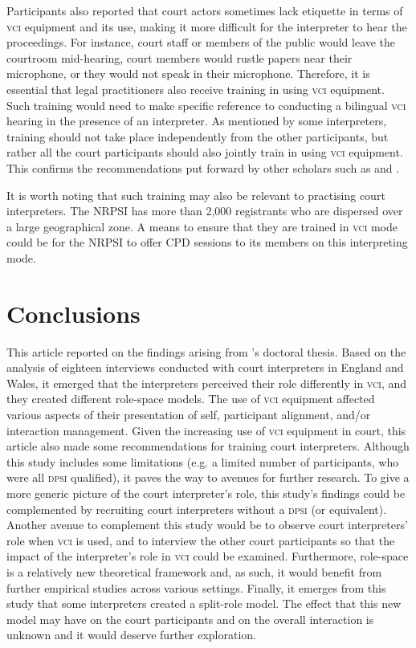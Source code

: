 \documentclass[output=paper]{langsci/langscibook}
\begin{document}
Participants also reported that court actors sometimes lack etiquette in terms of \textsc{vci} equipment and its use, making it more difficult for the interpreter to hear the proceedings. For instance, court staff or members of the public would leave the courtroom mid-hearing, court members would rustle papers near their microphone, or they would not speak in their microphone. Therefore, it is essential that legal practitioners also receive training in using \textsc{vci} equipment. Such training would need to make specific reference to conducting a bilingual \textsc{vci} hearing in the presence of an interpreter. As mentioned by some interpreters, training should not take place independently from the other participants, but rather all the court participants should also jointly train in using \textsc{vci} equipment. This confirms the recommendations put forward by other scholars such as \citet{Braun2011a} and \citet{Fowler2012}. 

It is worth noting that such training may also be relevant to practising court interpreters. The \textsc{NRPSI} has more than 2,000 registrants who are dispersed over a large geographical zone. A means to ensure that they are trained in \textsc{vci} mode could be for the \textsc{NRPSI} to offer \textsc{CPD} sessions to its members on this interpreting mode. 

\section{Conclusions}
\label{sec:devaux:7}
This article reported on the findings arising from \citet{Devaux2017b}’s doctoral thesis. Based on the analysis of eighteen interviews conducted with court interpreters in England and Wales, it emerged that the interpreters perceived their role differently in \textsc{vci}, and they created different role-space models. The use of \textsc{vci} equipment affected various aspects of their presentation of self, participant alignment, and/or interaction management. Given the increasing use of \textsc{vci} equipment in court, this article also made some recommendations for training court interpreters. Although this study includes some limitations (e.g. a limited number of participants, who were all \textsc{dpsi} qualified), it paves the way to avenues for further research. To give a more generic picture of the court interpreter’s role, this study’s findings could be complemented by recruiting court interpreters without a \textsc{dpsi} (or equivalent). Another avenue to complement this study would be to observe court interpreters’ role when \textsc{vci} is used, and to interview the other court participants so that the impact of the interpreter’s role in \textsc{vci} could be examined. Furthermore, role-space is a relatively new theoretical framework and, as such, it would benefit from further empirical studies across various settings. Finally, it emerges from this study that some interpreters created a split-role model. The effect that this new model may have on the court participants and on the overall interaction is unknown and it would deserve further exploration. 

{\sloppy\printbibliography[heading=subbibliography,notkeyword=this]} 
\end{document}
